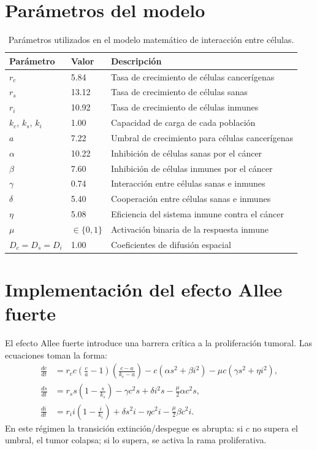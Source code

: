 \section{Parámetros del modelo}
\begin{table}[H]
\centering
\begin{tabular}{lll}
\toprule
\textbf{Parámetro} & \textbf{Valor} & \textbf{Descripción} \\
\midrule
$r_c$ & 5.84 & Tasa de crecimiento de células cancerígenas \\
$r_s$ & 13.12 & Tasa de crecimiento de células sanas \\
$r_i$ & 10.92 & Tasa de crecimiento de células inmunes \\
$k_c$, $k_s$, $k_i$ & 1.00 & Capacidad de carga de cada población \\
$a$ & 7.22 & Umbral de crecimiento para células cancerígenas \\
$\alpha$ & 10.22 & Inhibición de células sanas por el cáncer \\
$\beta$ & 7.60 & Inhibición de células inmunes por el cáncer \\
$\gamma$ & 0.74 & Interacción entre células sanas e inmunes \\
$\delta$ & 5.40 & Cooperación entre células sanas e inmunes \\
$\eta$ & 5.08 & Eficiencia del sistema inmune contra el cáncer \\
$\mu$ & $\in \{0, 1\}$ & Activación binaria de la respuesta inmune \\
$D_c = D_s = D_i$ & 1.00 & Coeficientes de difusión espacial \\
\bottomrule
\end{tabular}
\caption{Parámetros utilizados en el modelo matemático de interacción entre células.}
\end{table}

\section{Implementación del efecto Allee fuerte}
El efecto Allee fuerte introduce una barrera crítica a la proliferación tumoral. Las ecuaciones toman la forma:
\begin{align}
\frac{dc}{dt} &= r_c c \left(\frac{c}{a} - 1\right)\left(\frac{c - a}{k_c - a}\right) - c(\alpha s^2 + \beta i^2) - \mu c(\gamma s^2 + \eta i^2), \\
\frac{ds}{dt} &= r_s s \left(1 - \frac{s}{k_s}\right) - \gamma c^2 s + \delta i^2 s - \frac{\mu}{2} \alpha c^2 s, \\
\frac{di}{dt} &= r_i i \left(1 - \frac{i}{k_i}\right) + \delta s^2 i - \eta c^2 i - \frac{\mu}{2} \beta c^2 i.
\end{align}
En este régimen la transición extinción/despegue es abrupta: si $c$ no supera el umbral, el tumor colapsa; si lo supera, se activa la rama proliferativa.

